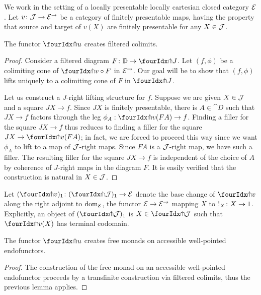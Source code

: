 \documentclass[reqno,10pt,a4paper,oneside,draft]{amsart}
\begin{document}
We work in the setting of a locally presentable locally cartesian closed category $\catE$.
Let $v \co \cal{J} \to \catE^\to$ be a category of finitely presentable maps, \ie having the property that source and target of $v(X)$ are finitely presentable for any $X \in \cal{J}$.

\begin{lemma}
The functor $\liftr{u}$ creates filtered colimits.
\end{lemma}

\begin{proof}
Consider a filtered diagram $F \co \cat{D} \to \liftr{J}$.
Let $(f, \phi)$ be a colimiting cone of $\liftr{v} \cc F$ in $\catE^\to$.
Our goal will be to show that $(f, \phi)$ lifts uniquely to a colimiting cone of $F$ in $\liftr{J}$.

Let us construct a $J$-right lifting structure for $f$.
Suppose we are given $X \in \cal{J}$ and a square $J X \to f$.
Since $J X$ is finitely presentable, there is $A \in \cat{D}$ such that $J X \to f$ factors through the leg $\phi_A : \liftr{v}(F A) \to f$.
Finding a filler for the square $J X \to f$ thus reduces to finding a filler for the square $J X \to \liftr{v}(F A)$; in fact, we are forced to proceed this way since we want $\phi_A$ to lift to a map of $\cal{J}$-right maps.
Since $F A$ is a $\cal{J}$-right map, we have such a filler.
The resulting filler for the square $J X \to f$ is independent of the choice of $A$ by coherence of $J$-right maps in the diagram $F$.
It is easily verified that the construction is natural in $X \in \cal{J}$.
\end{proof}

Let $(\liftr{v})_1 \co (\liftr{\cal{J}})_1 \to \catE$ denote the base change of $\liftr{v}$ along the right adjoint to $\dom_\catE$, \ie the functor $\catE \to \catE^\to$ mapping $X$ to $!_X \co X \to 1$.
Explicitly, an object of $(\liftr{\cal{J}})_1$ is $X \in \liftr{\cal{J}}$ such that $\liftr{v}(X)$ has terminal codomain.

\begin{corollary}
The functor $\liftr{u}$ creates free monads on accessible well-pointed endofunctors.
\end{corollary}

\begin{proof}
The construction of the free monad on an accessible well-pointed endofunctor proceeds by a transfinite construction via filtered colimits, thus the previous lemma applies.
\end{proof}
\end{document}
